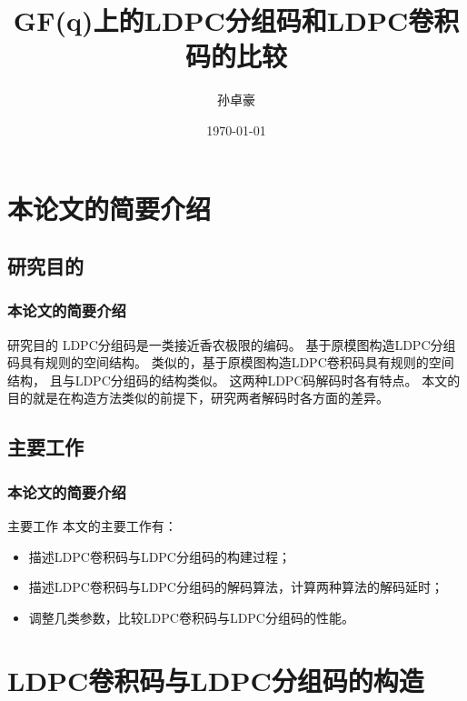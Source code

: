 \documentclass{beamer}
\title{GF(q)上的LDPC分组码和LDPC卷积码的比较}
\author{孙卓豪}
\institute{南开大学 \& 电子信息科学与技术}
\date{\today}
\begin{document}
\usetikzlibrary{shapes,snakes}
\usetikzlibrary{arrows, decorations.markings}
\begin{frame}
	\titlepage
\end{frame}

\begin{frame}[shrink]
	\tableofcontents
\end{frame}

\section{本论文的简要介绍}
\subsection{研究目的}
\begin{frame}
\frametitle{本论文的简要介绍}
	\begin{block}{研究目的}
	LDPC分组码是一类接近香农极限的编码。
	基于原模图构造LDPC分组码具有规则的空间结构。
	类似的，基于原模图构造LDPC卷积码具有规则的空间结构，
	且与LDPC分组码的结构类似。
	这两种LDPC码解码时各有特点。
	本文的目的就是在构造方法类似的前提下，研究两者解码时各方面的差异。
	\end{block}
\end{frame}

\subsection{主要工作}
\begin{frame}
\frametitle{本论文的简要介绍}
	\begin{block}{主要工作}
	本文的主要工作有：
	\begin{itemize}
		\item 描述LDPC卷积码与LDPC分组码的构建过程；
		\item 描述LDPC卷积码与LDPC分组码的解码算法，计算两种算法的解码延时；
		\item 调整几类参数，比较LDPC卷积码与LDPC分组码的性能。
	\end{itemize}
	\end{block}
\end{frame}


\section{LDPC卷积码与LDPC分组码的构造}
\end{document}

